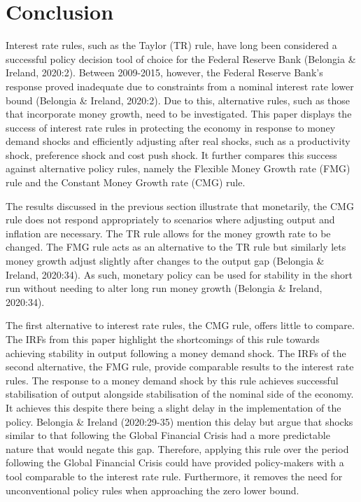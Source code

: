 \documentclass[11pt,preprint, authoryear]{elsarticle}
\numberwithin{equation}{section}
\numberwithin{figure}{section}
\numberwithin{table}{section}
\begin{document}
\newpage

\hypertarget{conclusion}{%
\section{Conclusion}\label{conclusion}}

Interest rate rules, such as the Taylor (TR) rule, have long been
considered a successful policy decision tool of choice for the Federal
Reserve Bank (Belongia \& Ireland, 2020:2). Between 2009-2015, however,
the Federal Reserve Bank's response proved inadequate due to constraints
from a nominal interest rate lower bound (Belongia \& Ireland, 2020:2).
Due to this, alternative rules, such as those that incorporate money
growth, need to be investigated. This paper displays the success of
interest rate rules in protecting the economy in response to money
demand shocks and efficiently adjusting after real shocks, such as a
productivity shock, preference shock and cost push shock. It further
compares this success against alternative policy rules, namely the
Flexible Money Growth rate (FMG) rule and the Constant Money Growth rate
(CMG) rule.

The results discussed in the previous section illustrate that
monetarily, the CMG rule does not respond appropriately to scenarios
where adjusting output and inflation are necessary. The TR rule allows
for the money growth rate to be changed. The FMG rule acts as an
alternative to the TR rule but similarly lets money growth adjust
slightly after changes to the output gap (Belongia \& Ireland, 2020:34).
As such, monetary policy can be used for stability in the short run
without needing to alter long run money growth (Belongia \& Ireland,
2020:34).

The first alternative to interest rate rules, the CMG rule, offers
little to compare. The IRFs from this paper highlight the shortcomings
of this rule towards achieving stability in output following a money
demand shock. The IRFs of the second alternative, the FMG rule, provide
comparable results to the interest rate rules. The response to a money
demand shock by this rule achieves successful stabilisation of output
alongside stabilisation of the nominal side of the economy. It achieves
this despite there being a slight delay in the implementation of the
policy. Belongia \& Ireland (2020:29-35) mention this delay but argue
that shocks similar to that following the Global Financial Crisis had a
more predictable nature that would negate this gap. Therefore, applying
this rule over the period following the Global Financial Crisis could
have provided policy-makers with a tool comparable to the interest rate
rule. Furthermore, it removes the need for unconventional policy rules
when approaching the zero lower bound.
\end{document}
